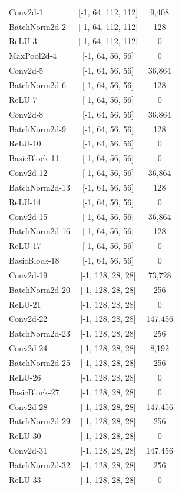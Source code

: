 \begin{center}
\begin{longtable}{|l|c|c|}
Conv2d-1 & [-1, 64, 112, 112] & 9,408 \\
BatchNorm2d-2 & [-1, 64, 112, 112] & 128 \\
ReLU-3 & [-1, 64, 112, 112] & 0 \\
MaxPool2d-4 & [-1, 64, 56, 56] & 0 \\
Conv2d-5 & [-1, 64, 56, 56] & 36,864 \\
BatchNorm2d-6 & [-1, 64, 56, 56] & 128 \\
ReLU-7 & [-1, 64, 56, 56] & 0 \\
Conv2d-8 & [-1, 64, 56, 56] & 36,864 \\
BatchNorm2d-9 & [-1, 64, 56, 56] & 128 \\
ReLU-10 & [-1, 64, 56, 56] & 0 \\
BasicBlock-11 & [-1, 64, 56, 56] & 0 \\
Conv2d-12 & [-1, 64, 56, 56] & 36,864 \\
BatchNorm2d-13 & [-1, 64, 56, 56] & 128 \\
ReLU-14 & [-1, 64, 56, 56] & 0 \\
Conv2d-15 & [-1, 64, 56, 56] & 36,864 \\
BatchNorm2d-16 & [-1, 64, 56, 56] & 128 \\
ReLU-17 & [-1, 64, 56, 56] & 0 \\
BasicBlock-18 & [-1, 64, 56, 56] & 0 \\
Conv2d-19 & [-1, 128, 28, 28] & 73,728 \\
BatchNorm2d-20 & [-1, 128, 28, 28] & 256 \\
ReLU-21 & [-1, 128, 28, 28] & 0 \\
Conv2d-22 & [-1, 128, 28, 28] & 147,456 \\
BatchNorm2d-23 & [-1, 128, 28, 28] & 256 \\
Conv2d-24 & [-1, 128, 28, 28] & 8,192 \\
BatchNorm2d-25 & [-1, 128, 28, 28] & 256 \\
ReLU-26 & [-1, 128, 28, 28] & 0 \\
BasicBlock-27 & [-1, 128, 28, 28] & 0 \\
Conv2d-28 & [-1, 128, 28, 28] & 147,456 \\
BatchNorm2d-29 & [-1, 128, 28, 28] & 256 \\
ReLU-30 & [-1, 128, 28, 28] & 0 \\
Conv2d-31 & [-1, 128, 28, 28] & 147,456 \\
BatchNorm2d-32 & [-1, 128, 28, 28] & 256 \\
ReLU-33 & [-1, 128, 28, 28] & 0 \\

\end{longtable}
\end{center}
